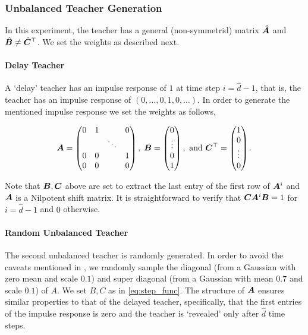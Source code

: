 \subsubsection{Unbalanced Teacher Generation}\label{sec:apdx:unbalanced_teacher_generation}
In this experiment, the teacher has a general (non-symmetrid) matrix $\hat{{\bm{A}}}$ and $\hat{{\bm{B}}}\neq\hat{{\bm{C}}}^\top$. We  set the weights as described next.

\paragraph{Delay Teacher}
A `delay' teacher has an impulse response of $1$ at time step $i=\hat{d}-1$, that is, the teacher has an impulse response of $(0,\dots,0,1,0,\dots)$. In order to generate the mentioned impulse response we set the weights as follows,

\begin{equation}\label{eq:step_func}
    {\bm{A}}=\begin{pmatrix}
    0 & 1 &   & 0 \\
      &   & \ddots &   \\
    0 & 0 &   & 1 \\
    0 & 0 &   & 0
    \end{pmatrix},\; {\bm{B}}=\begin{pmatrix}
    0 \\
    \vdots\\
    0\\
    1
    \end{pmatrix}, \text{ and } {\bm{C}}^\top=\begin{pmatrix}
    1 \\
    0 \\
    \vdots\\
    0
    \end{pmatrix}.
\end{equation}

Note that ${\bm{B}},{\bm{C}}$ above are set to extract the last entry of the first row of ${\bm{A}}^i$ and ${\bm{A}}$ is a Nilpotent shift matrix. It is straightforward to verify that ${\bm{C}}{\bm{A}}^i{\bm{B}}=1$ for $i=\hat{d}-1$ and $0$ otherwise.

\paragraph{Random Unbalanced Teacher}
The second unbalanced teacher is randomly generated. In order to avoid the caveats mentioned in , we randomly sample the diagonal (from a Gaussian with zero mean and scale $0.1$) and super diagonal (from a Gaussian with mean $0.7$ and scale $0.1$) of $A$. We set $B,C$ as in \eqref{eq:step_func}. The structure of ${\bm{A}}$ ensures similar properties to that of the delayed teacher, specifically, that the first entries of the impulse response is zero and the teacher is `revealed' only after $\hat{d}$ time steps.

